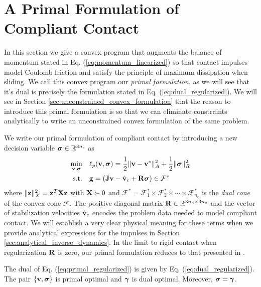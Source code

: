 
\section{A Primal Formulation of Compliant Contact}
\label{sec:primal_formulation}

In this section we give a convex program that augments the balance of momentum
stated in Eq. (\ref{eq:momentum_linearized}) so that contact impulses model
Coulomb friction and satisfy the principle of maximum dissipation when sliding.
We call this convex program our \emph{primal formulation}, as we will see that
it's dual is precisely the formulation stated in Eq.
(\ref{eq:dual_regularized}). We will see in Section
\ref{sec:unconstrained_convex_formulation} that the reason to introduce this
primal formulation is so that we can eliminate constraints analytically to write
an unconstrained convex formulation of the same problem.

We write our primal formulation of compliant contact by introducing a new
decision variable ${\bm{\sigma}}\in\mathbb{R}^{3n_c}$ as
\begin{equation}
	\begin{aligned}
	\min_{\mf{v},\bsigma} \quad & \ell_p(\mf{v},\bsigma) =
	\frac{1}{2}\Vert\mf{v}-\mf{v}^*\Vert_{A}^2 +
	\frac{1}{2} \Vert\bsigma\Vert_{R}^2\\
	\textrm{s.t.} \quad & \mf{g} = (\mf{J}\mf{v}-\hat{\mf{v}}_c + \mf{R}\bsigma) \in \mathcal{F}^*\\
	\end{aligned}
	\label{eq:primal_regularized}
\end{equation}
where $\Vert{\mathbf{z}}\Vert_X^2={\mathbf{z}}^T{\mathbf{X}}{\mathbf{z}}$ with ${\mathbf{X}}\succ 0$ and
$\mathcal{F^*}= \mathcal{F}^*_1 \times \mathcal{F}^*_2 \times \cdots \times
\mathcal{F}^*_{n_c}$ is the \emph{dual cone} of the convex cone $\mathcal{F}$.
The positive diagonal matrix ${\mathbf{R}}\in\mathbb{R}^{3n_c\times 3n_c}$ and the
vector of stabilization velocities $\hat{{\mathbf{v}}}_c$ encodes the problem data
needed to model compliant contact. We will establish a very clear physical
meaning for these terms when we provide analytical expressions for the impulses
in Section \ref{sec:analytical_inverse_dynamics}. In the limit to rigid contact
when regularization ${\mathbf{R}}$ is zero, our primal formulation reduces to that
presented in \cite{bib:mazhar2014}.

\begin{theorem}
The dual of Eq. (\ref{eq:primal_regularized}) is given by Eq.
(\ref{eq:dual_regularized}). The pair $\{{\mathbf{v}},{\bm\sigma}\}$ is primal optimal and
${\bm\gamma}$ is dual optimal. Moreover, ${\bm\sigma} = {\bm\gamma}$.
\end{theorem}


